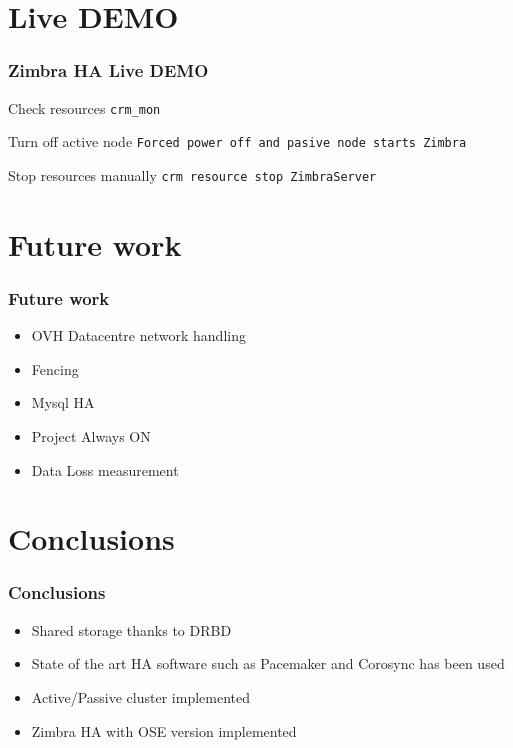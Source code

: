 \documentclass[10pt]{beamer}
\begin{document}
\section {Live DEMO}

\begin{frame}

\frametitle{Zimbra HA Live DEMO}


\begin{center}
    \begin{block}{Check resources}
{\tt crm\_mon}
    \end{block}
    \begin{block}{Turn off active node}
{\tt Forced power off and pasive node starts Zimbra}
    \end{block}
    \begin{block}{Stop resources manually}
{\tt crm resource stop ZimbraServer}
    \end{block}
    

\end{center}




\end{frame}
\section {Future work}

\begin{frame}
\frametitle{Future work}

\begin{itemize}
  \item OVH Datacentre network handling
  \item Fencing
  \item Mysql HA
  \item Project Always ON
  \item Data Loss measurement
\end{itemize}
\end{frame}
\section {Conclusions}
\begin{frame}

\frametitle{Conclusions}

\begin{center}
  \begin{itemize}
    \item Shared storage thanks to DRBD
    \item State of the art HA software such as Pacemaker and Corosync has been used
    \item Active/Passive cluster implemented
    \item Zimbra HA with OSE version implemented
  \end{itemize}
\end{center}

\end{frame}
\end{document}
